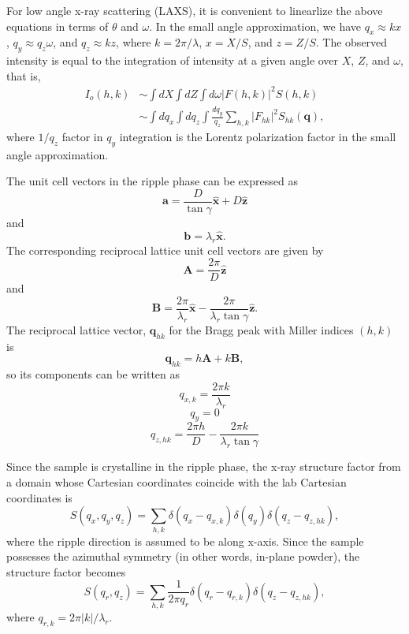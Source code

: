 \documentclass[12pt,letterpaper]{article}
\newcommand{\xhat}{\mathbf{\hat{x}}}
\newcommand{\zhat}{\mathbf{\hat{z}}}
\newcommand{\+}{^{\dagger}}%
\begin{document}
For low angle x-ray scattering (LAXS), it is convenient to linearlize the above
equations in terms of $\theta$ and $\omega$. In the small angle approximation, 
we have $q_x \approx kx$, $q_y \approx q_z\omega$, and $q_z \approx kz$, where
$k=2\pi/\lambda$, $x=X/S$, and $z=Z/S$. The observed intensity is equal to
the integration of intensity at a given angle over $X$, $Z$, and $\omega$, 
that is, 
\begin{align}
  I_o(h,k) &\sim \int dX \int dZ \int d\omega |F(h,k)|^2 S(h,k) \nonumber \\
           &\sim \int dq_x \int dq_z \int \frac{dq_y}{q_z} \sum_{h,k} |F_{hk}|^2 S_{hk}(\mathbf{q}),
\end{align}
where $1/q_z$ factor in $q_y$ integration is the Lorentz polarization factor
in the small angle approximation. 

The unit cell vectors in the ripple phase can be expressed as 
\begin{equation}
  \mathbf{a} = \frac{D}{\tan\gamma}\xhat + D\zhat
\end{equation}
and
\begin{equation}
  \mathbf{b} = \lambda_r\xhat.
\end{equation}
The corresponding reciprocal lattice unit cell vectors are given by
\begin{equation}
  \mathbf{A} = \frac{2\pi}{D}\zhat
\end{equation}
and
\begin{equation}
  \mathbf{B} = \frac{2\pi}{\lambda_r}\xhat - \frac{2\pi}{\lambda_r\tan\gamma}\zhat.
\end{equation}
The reciprocal lattice vector, $\mathbf{q}_{hk}$ for the Bragg peak with 
Miller indices $(h,k)$ is 
\begin{equation}
  \mathbf{q}_{hk}=h\mathbf{A}+k\mathbf{B},
\end{equation}
so its components can be written as
\begin{equation}
  q_{x,k} = \frac{2\pi k}{\lambda_r}
\end{equation}
\begin{equation}
  q_y = 0
\end{equation}
\begin{equation}
  q_{z,hk} = \frac{2\pi h}{D} - \frac{2\pi k}{\lambda_r\tan\gamma}
\end{equation}

Since the sample is crystalline in the ripple phase, the x-ray structure factor
from a domain whose Cartesian coordinates coincide with the lab Cartesian 
coordinates is 
\begin{equation}
  S(q_x,q_y,q_z) = \sum_{h,k} \delta(q_x-q_{x,k}) \delta(q_y) \delta(q_z-q_{z,hk}),
\end{equation}
where the ripple direction is assumed to be along x-axis. Since the sample 
possesses the azimuthal symmetry (in other words, in-plane powder), the
structure factor becomes
\begin{equation}
  S(q_r,q_z) = \sum_{h,k} \frac{1}{2\pi q_r}\delta(q_r-q_{r,k})\delta(q_z-q_{z,hk}),
\end{equation} 
where $q_{r,k}=2\pi |k|/\lambda_r$. 
\end{document}
